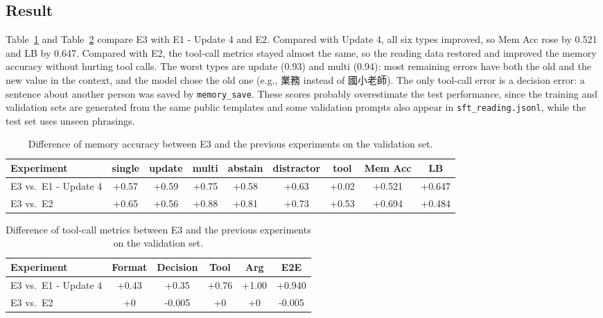 \documentclass{article}
\begin{document}
\subsection{Result}
Table~\ref{tab:e3mem} and Table~\ref{tab:e3tool} compare E3 with E1 - Update 4 and E2.
Compared with Update 4, all six types improved, so Mem Acc rose by 0.521 and LB by 0.647.
Compared with E2, the tool-call metrics stayed almost the same, so the reading data restored and improved the memory accuracy without hurting tool calls.
The worst types are update (0.93) and multi (0.94): most remaining errors have both the old and the new value in the context, and the model chose the old one (e.g., 業務 instead of 國小老師).
The only tool-call error is a decision error: a sentence about another person was saved by \texttt{memory\_save}.
These scores probably overestimate the test performance, since the training and validation sets are generated from the same public templates and some validation prompts also appear in \texttt{sft\_reading.jsonl}, while the test set uses unseen phrasings.
\begin{table}[H]
    \centering
    \small
    \begin{tabular}{lcccccccc}
        \toprule
        Experiment & single & update & multi & abstain & distractor & tool & Mem Acc & LB \\
        \midrule
        E3 vs.\ E1 - Update 4 & +0.57 & +0.59 & +0.75 & +0.58 & +0.63 & +0.02 & +0.521 & +0.647 \\
        E3 vs.\ E2 & +0.65 & +0.56 & +0.88 & +0.81 & +0.73 & +0.53 & +0.694 & +0.484 \\
        \bottomrule
    \end{tabular}
    \caption{Difference of memory accuracy between E3 and the previous experiments on the validation set.}
    \label{tab:e3mem}
\end{table}
\begin{table}[H]
    \centering
    \small
    \begin{tabular}{lccccc}
        \toprule
        Experiment & Format & Decision & Tool & Arg & E2E \\
        \midrule
        E3 vs.\ E1 - Update 4 & +0.43 & +0.35 & +0.76 & +1.00 & +0.940 \\
        E3 vs.\ E2 & +0 & -0.005 & +0 & +0 & -0.005 \\
        \bottomrule
    \end{tabular}
    \caption{Difference of tool-call metrics between E3 and the previous experiments on the validation set.}
    \label{tab:e3tool}
\end{table}
\end{document}
